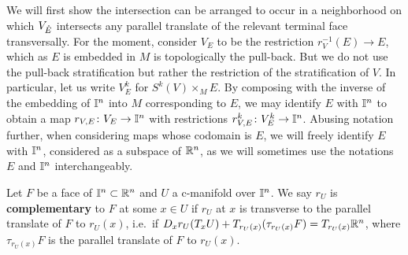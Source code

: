 We will first show the intersection
can be arranged to occur in a neighborhood on which $V_{\mathring{E}}$ intersects any parallel translate
of the relevant terminal face transversally.
For the moment,  consider $V_E$ to be the restriction $r_V^{-1}(E) \to E$, which
as $E$ is embedded in $M$  is topologically the pull-back.
But  we do not use the pull-back stratification but rather the restriction of the stratification of $V$.
In particular, let us write $V_E^k$ for $S^k(V) \times_M E$.
By composing with the inverse of the embedding of $\mathbb{I}^n$ into $M$ corresponding to $E$,
we may identify $E$ with $\mathbb{I}^n$ to obtain a map $r_{V,E} \colon V_E \to \mathbb{I}^n$ with restrictions
$r_{V,E}^k \colon V_E^k \to \mathbb{I}^n$.
Abusing notation further, when considering maps whose codomain is $E$, we will freely identify $E$ with $\mathbb{I}^n$, considered as a subspace of $\mathbb{R}^n$, as we will sometimes use the notations $E$ and $\mathbb{I}^n$ interchangeably.



\begin{definition}
Let $F$ be a face of $\mathbb{I}^n \subset \mathbb{R}^n$ and $U$ a c-manifold over $\mathbb{I}^n$.  We say $r_U$ is
{\bf complementary} to $F$ at some $x \in U$ if $r_U$ at $x$ is transverse to the parallel translate of $F$ to $r_U(x)$, i.e.\ if $D_xr_U(T_xU) + T_{r_U(x)}(\tau_{r_U(x)} F) = T_{r_U(x)}\mathbb{R}^n$, where $\tau_{r_U(x)} F$ is the parallel translate of $F$ to $r_U(x)$.
\end{definition}


